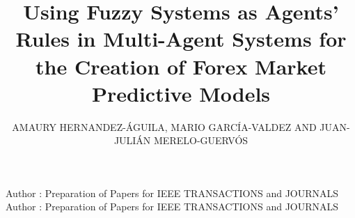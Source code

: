 \documentclass{ieeeaccess}
\begin{document}

\title{Using Fuzzy Systems as Agents' Rules in Multi-Agent Systems
for the Creation of Forex Market Predictive Models}

\author{
    \uppercase{Amaury Hernandez-Águila,
    \uppercase{Mario García-Valdez
      and
    Juan-Julián Merelo-Guervós}}}
\address[1]{National Technological Institute of Mexico, Calzada Del Tecnológico s/n, Fraccionamiento Tomas Aquino, Tijuana, BC 22414 Mexico (e-mail: {amerhag,mario}@tectijuana.edu.mx)}
\address[2]{University of Granada, Campus Aynadamar Daniel Saucedo Aranda s/n, Granada 18071, 80523 Spain (e-mail: jmerelo@geneura.ugr.es)}

\markboth
{Author \headeretal: Preparation of Papers for IEEE TRANSACTIONS and JOURNALS}
{Author \headeretal: Preparation of Papers for IEEE TRANSACTIONS and JOURNALS}


\end{document}
